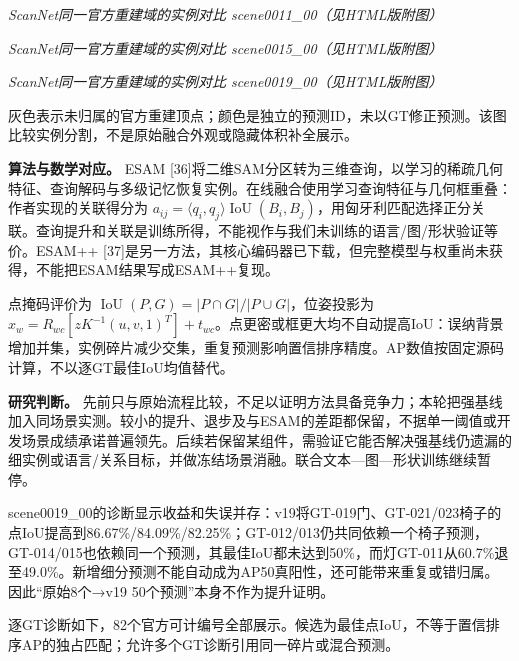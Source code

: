 \documentclass[UTF8,fontset=fandol]{ctexart}
\begin{document}
\textit{ScanNet同一官方重建域的实例对比 scene0011\_00（见HTML版附图）}



\textit{ScanNet同一官方重建域的实例对比 scene0015\_00（见HTML版附图）}



\textit{ScanNet同一官方重建域的实例对比 scene0019\_00（见HTML版附图）}



灰色表示未归属的官方重建顶点；颜色是独立的预测ID，未以GT修正预测。该图比较实例分割，不是原始融合外观或隐藏体积补全展示。



\textbf{算法与数学对应。} ESAM [36]将二维SAM分区转为三维查询，以学习的稀疏几何特征、查询解码与多级记忆恢复实例。在线融合使用学习查询特征与几何框重叠：作者实现的关联得分为 $a_{ij}=\langle q_i,q_j\rangle\operatorname{IoU}(B_i,B_j)$，用匈牙利匹配选择正分关联。查询提升和关联是训练所得，不能视作与我们未训练的语言/图/形状验证等价。ESAM++ [37]是另一方法，其核心编码器已下载，但完整模型与权重尚未获得，不能把ESAM结果写成ESAM++复现。



点掩码评价为 $\operatorname{IoU}(P,G)=|P\cap G|/|P\cup G|$，位姿投影为 $x_w=R_{wc}[zK^{-1}(u,v,1)^T]+t_{wc}$。点更密或框更大均不自动提高IoU：误纳背景增加并集，实例碎片减少交集，重复预测影响置信排序精度。AP数值按固定源码计算，不以逐GT最佳IoU均值替代。



\textbf{研究判断。} 先前只与原始流程比较，不足以证明方法具备竞争力；本轮把强基线加入同场景实测。较小的提升、退步及与ESAM的差距都保留，不据单一阈值或开发场景成绩承诺普遍领先。后续若保留某组件，需验证它能否解决强基线仍遗漏的细实例或语言/关系目标，并做冻结场景消融。联合文本—图—形状训练继续暂停。



scene0019\_00的诊断显示收益和失误并存：v19将GT-019门、GT-021/023椅子的点IoU提高到86.67\%/84.09\%/82.25\%；GT-012/013仍共同依赖一个椅子预测，GT-014/015也依赖同一个预测，其最佳IoU都未达到50\%，而灯GT-011从60.7\%退至49.0\%。新增细分预测不能自动成为AP50真阳性，还可能带来重复或错归属。因此“原始8个→v19 50个预测”本身不作为提升证明。



逐GT诊断如下，82个官方可计编号全部展示。候选为最佳点IoU，不等于置信排序AP的独占匹配；允许多个GT诊断引用同一碎片或混合预测。
\end{document}
